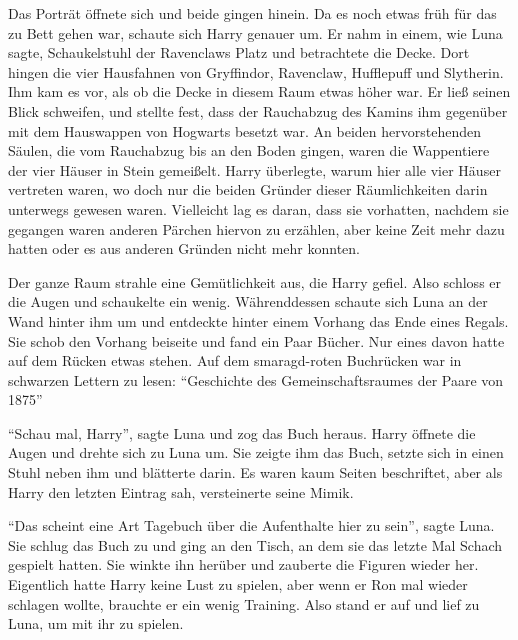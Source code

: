 Das Porträt öffnete sich und beide gingen hinein. Da es noch etwas früh für das zu Bett gehen war, schaute sich Harry genauer um. Er nahm in einem, wie Luna sagte, Schaukelstuhl der Ravenclaws Platz und betrachtete die Decke. Dort hingen die vier Hausfahnen von Gryffindor, Ravenclaw, Hufflepuff und Slytherin. Ihm kam es vor, als ob die Decke in diesem Raum etwas höher war. Er ließ seinen Blick schweifen, und stellte fest, dass der Rauchabzug des Kamins ihm gegenüber mit dem Hauswappen von Hogwarts besetzt war. An beiden hervorstehenden Säulen, die vom Rauchabzug bis an den Boden gingen, waren die Wappentiere der vier Häuser in Stein gemeißelt. Harry überlegte, warum hier alle vier Häuser vertreten waren, wo doch nur die beiden Gründer dieser Räumlichkeiten darin unterwegs gewesen waren. Vielleicht lag es daran, dass sie vorhatten, nachdem sie gegangen waren anderen Pärchen hiervon zu erzählen, aber keine Zeit mehr dazu hatten oder es aus anderen Gründen nicht mehr konnten.

Der ganze Raum strahle eine Gemütlichkeit aus, die Harry gefiel. Also schloss er die Augen und schaukelte ein wenig. Währenddessen schaute sich Luna an der Wand hinter ihm um und entdeckte hinter einem Vorhang das Ende eines Regals. Sie schob den Vorhang beiseite und fand ein Paar Bücher. Nur eines davon hatte auf dem Rücken etwas stehen. Auf dem smaragd-roten Buchrücken war in schwarzen Lettern zu lesen: \enquote{Geschichte des Gemeinschaftsraumes der Paare von 1875\agst}

\enquote{Schau mal, Harry}, sagte Luna und zog das Buch heraus. Harry öffnete die Augen und drehte sich zu Luna um. Sie zeigte ihm das Buch, setzte sich in einen Stuhl neben ihm und blätterte darin. Es waren kaum Seiten beschriftet, aber als Harry den letzten Eintrag sah, versteinerte seine Mimik. 

\enquote{Das scheint eine Art Tagebuch über die Aufenthalte hier zu sein}, sagte Luna. Sie schlug das Buch zu und ging an den Tisch, an dem sie das letzte Mal Schach gespielt hatten. Sie winkte ihn herüber und zauberte die Figuren wieder her. Eigentlich hatte Harry keine Lust zu spielen, aber wenn er Ron mal wieder schlagen wollte, brauchte er ein wenig Training. Also stand er auf und lief zu Luna, um mit ihr zu spielen.

